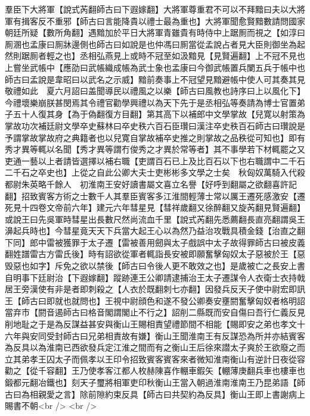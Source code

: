 羣臣下大將軍【說式芮翻師古曰下遐嫁翻】大將軍尊重君不可以不拜黯曰夫以大將軍有揖客反不重邪【師古曰言能降貴以禮士最為重也】大將軍聞愈賢黯數請問國家朝廷所疑【數所角翻】遇黯加於平日大將軍青雖貴有時侍中上踞厠而視之【如淳曰厠溷也孟康曰厠牀邊側也師古曰如說是也仲馮曰厠當從孟說占者見大臣則御坐為起然則踞厠者輕之也】丞相弘燕見上或時不冠至如汲黯見【見賢遍翻】上不冠不見也上嘗坐武帳中【應劭曰武帳織成帳為武士象也孟康曰今御武帳置兵闌五兵于帳中也師古曰孟說是韋昭曰以武名之示威】黯前奏事上不冠望見黯避帳中使人可其奏其見敬禮如此　夏六月詔曰盖聞導民以禮風之以樂【師古曰風教也詩序曰上以風化下】今禮壞樂崩朕甚閔焉其令禮官勸學興禮以為天下先于是丞相弘等奏請為博士官置弟子五十人復其身【為于偽翻復方目翻】第其高下以補郎中文學掌故【兒寛以射策為掌故功次補廷尉文學卒史蘇林曰卒史秩六百石臣瓚曰漢注卒史秩百石師古曰瓚說是予謂掌故掌故府之典籍者也以兒寛自掌故補卒史推之則掌故之品秩從可知也】即有秀才異等輒以名聞【秀才異等謂冇俊秀之才異於常等者】其不事學若下材輒罷之又吏通一藝以上者請皆選擇以補右職【吏謂百石已上及比百石以下也右職謂中二千石二千石之卒史也】上從之自此公卿大夫士吏彬彬多文學之士矣　秋匈奴萬騎入代殺都尉朱英略千餘人　初淮南王安好讀書屬文喜立名譽【好呼到翻屬之欲翻喜許記翻】招致賓客方術之士數千人其羣臣賓客多江淮間輕薄士常以厲王遷死感激安【遷死見十四卷文帝前六年】建元六年彗星見【彗祥歲翻又徐醉翻又旋芮翻見賢遍翻】或說王曰先吳軍時彗星出長數尺然尚流血千里【說式芮翻先悉薦翻長直亮翻謂吳王濞起兵時也】今彗星竟天天下兵當大起王心以為然乃益治攻戰具積金錢【治直之翻下同】郎中雷被獲罪于太子遷【雷被善用劒與太子戲誤中太子故得罪師古曰被皮義翻姓譜雷古方雷氏後】時有詔欲從軍者輒詣長安被即願奮擊匈奴太子惡被於王【惡毁惡也如字】斥免之欲以禁後【師古曰令後人更不敢效之也】是歲被亡之長安上書自明事下廷尉治【下遐嫁翻】蹤跡連王公卿請逮捕治王太子遷謀令人衣衛士衣持戟居王旁漢使有非是者即刺殺之【人衣於既翻刺七亦翻】因發兵反天子使中尉宏即訊王【師古曰即就也就問也】王視中尉顔色和遂不發公卿奏安壅閼奮擊匈奴者格明詔當弃市【閼音遏師古曰格音閣謂閣止不行之】詔削二縣既而安自傷曰吾行仁義反見削地耻之于是為反謀益甚安與衡山王賜相責望禮節間不相能【賜即安之弟也孝文十六年與安同受封師古曰兄弟相責故有嫌】衡山王聞淮南王有反謀恐為所并亦結賓客為反具以為淮南已西欲發兵定江淮之間而有之衡山王后徐來譛太子爽於王欲廢之而立其弟孝王囚太子而佩孝以王印令招致賓客賓客來者微知淮南衡山有逆計日夜從容勸之【從千容翻】王乃使孝客江都人枚赫陳喜作輣車鍜矢【輣薄庚翻兵車也樓車也鍛都元翻冶鐵也】刻天子璽將相軍吏印秋衡山王當入朝過淮南淮南王乃昆弟語【師古曰為相親愛之言】除前隙約束反具【師古曰共契約為反具】衡山王即上書謝病上賜書不朝<br />
<br />

